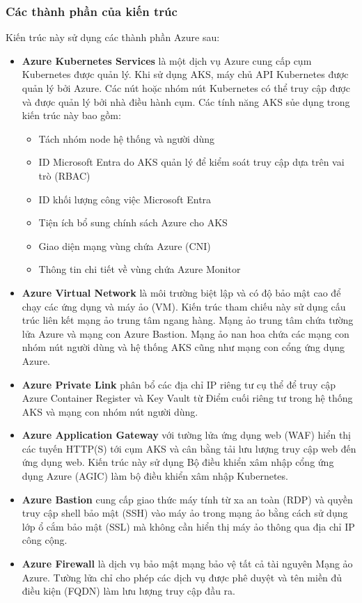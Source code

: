 \subsubsection{Các thành phần của kiến trúc}
\noindent Kiến trúc này sử dụng các thành phần Azure sau:
\begin{itemize}
    \item \textbf{Azure Kubernetes Services} là một dịch vụ Azure cung cấp cụm Kubernetes được quản lý. Khi sử dụng AKS, máy chủ API Kubernetes được quản lý bởi Azure. Các nút hoặc nhóm nút Kubernetes có thể truy cập được và được quản lý bởi nhà điều hành cụm.
    Các tính năng AKS sủe dụng trong kiến trúc này bao gồm:
    \begin{itemize}
        \item Tách nhóm node hệ thống và người dùng
        \item ID Microsoft Entra do AKS quản lý để kiểm soát truy cập dựa trên vai trò (RBAC)
        \item ID khối lượng công việc Microsoft Entra
        \item Tiện ích bổ sung chính sách Azure cho AKS
        \item Giao diện mạng vùng chứa Azure (CNI)
        \item Thông tin chi tiết về vùng chứa Azure Monitor
    \end{itemize} 
    \item \textbf{Azure Virtual Network} là môi trường biệt lập và có độ bảo mật cao để chạy các ứng dụng và máy ảo (VM). Kiến trúc tham chiếu này sử dụng cấu trúc liên kết mạng ảo trung tâm ngang hàng. Mạng ảo trung tâm chứa tường lửa Azure và mạng con Azure Bastion. Mạng ảo nan hoa chứa các mạng con nhóm nút người dùng và hệ thống AKS cũng như mạng con cổng ứng dụng Azure.
    \item  \textbf{Azure Private Link} phân bổ các địa chỉ IP riêng tư cụ thể để truy cập Azure Container Register và Key Vault từ Điểm cuối riêng tư trong hệ thống AKS và mạng con nhóm nút người dùng.
    \item \textbf{Azure Application Gateway} với tường lửa ứng dụng web (WAF) hiển thị các tuyến HTTP(S) tới cụm AKS và cân bằng tải lưu lượng truy cập web đến ứng dụng web. Kiến trúc này sử dụng Bộ điều khiển xâm nhập cổng ứng dụng Azure (AGIC) làm bộ điều khiển xâm nhập Kubernetes.
    \item \textbf{Azure Bastion} cung cấp giao thức máy tính từ xa an toàn (RDP) và quyền truy cập shell bảo mật (SSH) vào máy ảo trong mạng ảo bằng cách sử dụng lớp ổ cắm bảo mật (SSL) mà không cần hiển thị máy ảo thông qua địa chỉ IP công cộng.
    \item \textbf{Azure Firewall} là dịch vụ bảo mật mạng bảo vệ tất cả tài nguyên Mạng ảo Azure. Tường lửa chỉ cho phép các dịch vụ được phê duyệt và tên miền đủ điều kiện (FQDN) làm lưu lượng truy cập đầu ra. 
\end{itemize}
